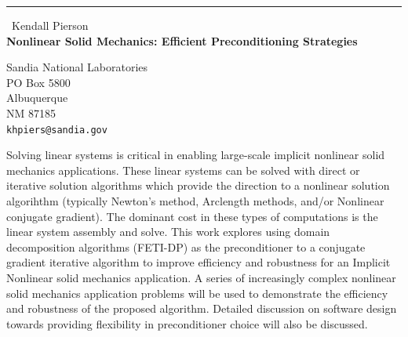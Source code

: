 \documentclass{report}
\begin{document}
\begin{center}
\rule{6in}{1pt} \
{\large Kendall Pierson \\
{\bf Nonlinear Solid Mechanics: Efficient Preconditioning Strategies}}

Sandia National Laboratories \\ PO Box 5800 \\ Albuquerque \\ NM 87185
\\
{\tt khpiers@sandia.gov}\end{center}

Solving linear systems is critical in enabling large-scale
implicit nonlinear solid mechanics applications. These
linear systems can be solved with direct or iterative
solution algorithms which provide the direction to a
nonlinear solution algorihthm (typically Newton's method,
Arclength methods, and/or Nonlinear conjugate gradient).
The dominant cost in these types of computations is the
linear system assembly and solve. This work explores using
domain decomposition algorithms (FETI-DP) as the preconditioner
to a conjugate gradient iterative algorithm to improve
efficiency and robustness for an Implicit Nonlinear solid
mechanics application. A series of increasingly complex
nonlinear solid mechanics application problems will be used
to demonstrate the efficiency and robustness of the proposed
algorithm. Detailed discussion on software design towards
providing flexibility in preconditioner choice will also
be discussed.
\end{document}
